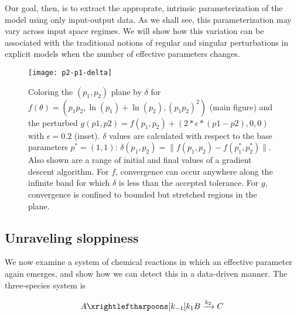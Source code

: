 Our goal, then, is to extract the approprate, intrinsic
parameterization of the model using only input-output data. As we
shall see, this parameterization may vary across input space regimes.
We will show how this variation can be associated with the traditional
notions of regular and singular perturbations in explicit models when
the number of effective parameters changes.


\begin{figure}
  \centerline{\texttt{[image: p2-p1-delta]}}
  \caption[Illustration of effects of sloppiness on
  optimization]{Coloring the $(p_1, p_2)$ plane by $\delta$ for
    $f(\theta) = (p_1 p_2 , \ln(p_1) + \ln(p_2) , (p_1 p_2)^2)$ (main
    figure) and the perturbed $g(p1, p2) = f(p_1, p_2) +
    \left(2*\epsilon*(p1 - p2), 0, 0\right)$ with $\epsilon = 0.2$
    (inset). $\delta$ values are calculated with respect to the base
    parameters $p^* = (1, 1)$: $\delta(p_1, p_2) = \| f(p_1, p_2) -
    f(p_1^*, p_2^*)\|$. Also shown are a range of initial and final values of
    a gradient descent algorithm. For $f$, convergence can occur
    anywhere along the infinite band for which $\delta$ is less than
    the accepted tolerance. For $g$, convergence is confined to
    bounded but stretched regions in the plane.
    \label{fig:non-id} }
\end{figure}



\subsection{Unraveling sloppiness} \label{sec:rr} 

We now examine a system of chemical reactions in which an effective
parameter again emerges, and show how we can detect this in a
data-driven manner. The three-species system is

\begin{align}
  A
  \xrightleftharpoons[k_{-1}]{k_1}
  B
  \xrightarrow[]{k_2}
  C
  \label{mech:abc}
\end{align}

